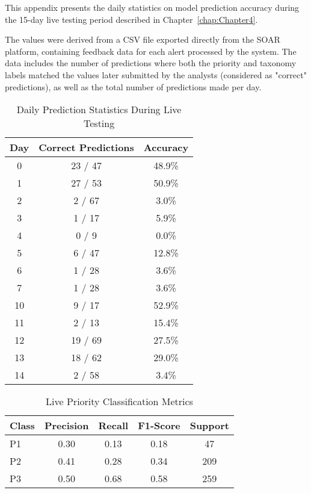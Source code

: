 This appendix presents the daily statistics on model prediction accuracy during the 15-day live testing period described in Chapter~\ref{chap:Chapter4}. 

The values were derived from a CSV file exported directly from the SOAR platform, containing feedback data for each alert processed by the system. 
The data includes the number of predictions where both the priority and taxonomy labels matched the values later submitted by the analysts (considered as "correct" predictions), as well as the total number of predictions made per day.

\begin{table}[h!]
\centering
\caption{Daily Prediction Statistics During Live Testing}
\label{tab:live_daily_accuracy}
\begin{tabular}{@{}ccc@{}}
\toprule
\textbf{Day} & \textbf{Correct Predictions} & \textbf{Accuracy} \\
\midrule
0 & 23 / 47 & 48.9\% \\
1 & 27 / 53 & 50.9\% \\
2 & 2 / 67 & 3.0\% \\
3 & 1 / 17 & 5.9\% \\
4 & 0 / 9 & 0.0\% \\
5 & 6 / 47 & 12.8\% \\
6 & 1 / 28 & 3.6\% \\
7 & 1 / 28 & 3.6\% \\
10 & 9 / 17 & 52.9\% \\
11 & 2 / 13 & 15.4\% \\
12 & 19 / 69 & 27.5\% \\
13 & 18 / 62 & 29.0\% \\
14 & 2 / 58 & 3.4\% \\
\bottomrule
\end{tabular}
\end{table}

\begin{table}[h!]
    \centering
    \caption{Live Priority Classification Metrics}
    \label{tab:live_priority_metrics}
    \begin{tabular}{|l|c|c|c|c|}
    \hline
    \textbf{Class} & \textbf{Precision} & \textbf{Recall} & \textbf{F1-Score} & \textbf{Support} \\
    \hline
    P1 & 0.30 & 0.13 & 0.18 & 47 \\
    \hline
    P2 & 0.41 & 0.28 & 0.34 & 209 \\
    \hline
    P3 & 0.50 & 0.68 & 0.58 & 259 \\
    \hline
    \end{tabular}
\end{table}


